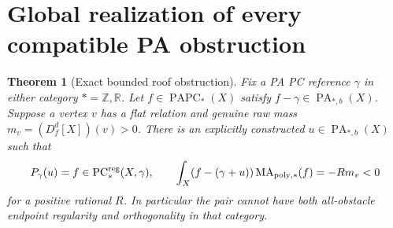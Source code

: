 \documentclass[11pt]{article}
\newtheorem{theorem}{Theorem}
\newcommand{\R}{\mathbb R}
\newcommand{\Z}{\mathbb Z}
\newcommand{\PC}{\operatorname{PC}}
\newcommand{\PA}{\operatorname{PA}}
\newcommand{\PAPC}{\operatorname{PAPC}}
\newcommand{\MAstar}{\operatorname{MA}_{\mathrm{poly},*}}
\begin{document}
\section{Global realization of every compatible PA obstruction}
\begin{theorem}[Exact bounded roof obstruction]\label{obstruction}
Fix a PA PC reference \(\gamma\) in either category \(*=\Z,\R\).
Let \(f\in\PAPC_*(X)\) satisfy \(f-\gamma\in\PA_{*,b}(X)\).
Suppose a vertex \(v\) has a flat relation and genuine raw mass
\(m_v=(D_f^d[X])(v)>0\).
There is an explicitly constructed \(u\in\PA_{*,b}(X)\) such that
\[
 P_\gamma(u)=f\in\PC^{\rm reg}_*(X,\gamma),\qquad
 \int_X(f-(\gamma+u))\MAstar(f)=-R m_v<0
\]
for a positive rational \(R\). In particular the pair cannot have both
all-obstacle endpoint regularity and orthogonality in that category.
\end{theorem}
\end{document}
